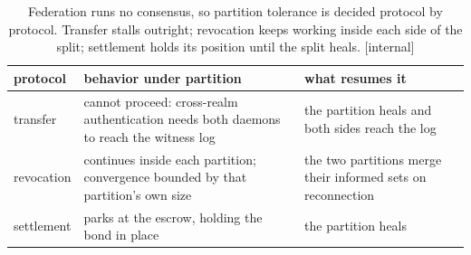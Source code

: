 %
\begin{table}[H]
\centering
\caption{Federation runs no consensus, so partition tolerance is decided
protocol by protocol. Transfer stalls outright; revocation keeps working
inside each side of the split; settlement holds its position until the
split heals. [internal]}
\label{tab:fh-partition}
\small
\renewcommand{\arraystretch}{1.2}
\begin{tabularx}{\linewidth}{@{}l >{\raggedright\arraybackslash}X >{\raggedright\arraybackslash}X@{}}
\toprule
\textbf{protocol} & \textbf{behavior under partition} & \textbf{what resumes it} \\
\midrule
transfer & cannot proceed: cross-realm authentication needs both daemons to reach the witness log & the partition heals and both sides reach the log \\
revocation & continues inside each partition; convergence bounded by that partition's own size & the two partitions merge their informed sets on reconnection \\
settlement & parks at the escrow, holding the bond in place & the partition heals \\
\bottomrule
\end{tabularx}
\end{table}
